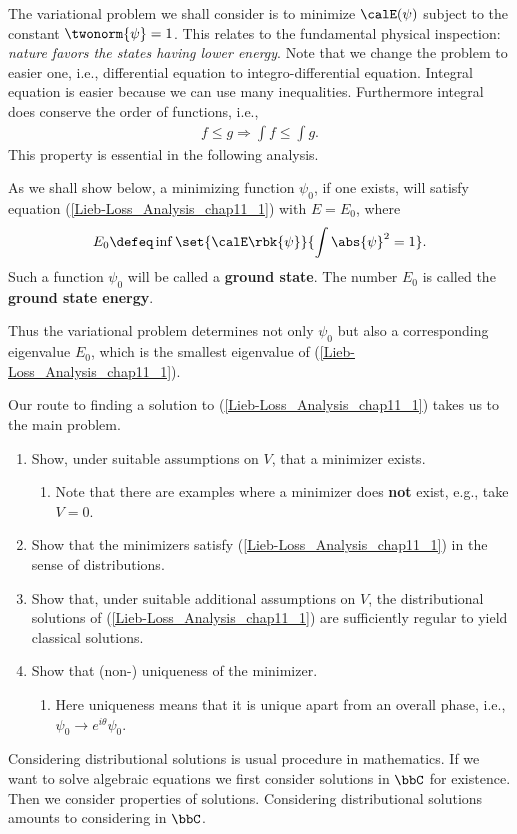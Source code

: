 \documentclass[openany, a4paper, oneside]{jsbook}
\begin{document}
The variational problem we shall consider is to minimize $\calE (\psi)$ subject to the constant $\twonorm{\psi} = 1$.
This relates to the fundamental physical inspection: \textit{nature favors the states having lower energy}.
Note that we change the problem to easier one, i.e., differential equation to integro-differential equation.
Integral equation is easier because we can use many inequalities.
Furthermore integral does conserve the order of functions, i.e.,
\begin{align}
 f \leq g
 \Longrightarrow
 \int f \leq \int g.
\end{align}
This property is essential in the following analysis.

As we shall show below, a minimizing function $\psi_0$, if one exists, will satisfy equation (\ref{Lieb-Loss_Analysis_chap11_1})
with $E = E_0$, where
\begin{align}
 E_0
 \defeq
 \inf \set{\calE \rbk{\psi}} {\int \abs{\psi}^2 = 1}.
\end{align}
Such a function $\psi_0$ will be called a \textbf{ground state}.
The number $E_0$ is called the \textbf{ground state energy}.

Thus the variational problem determines not only $\psi_0$ but also a corresponding eigenvalue $E_0$,
which is the smallest eigenvalue of (\ref{Lieb-Loss_Analysis_chap11_1}).

Our route to finding a solution to (\ref{Lieb-Loss_Analysis_chap11_1}) takes us to the main problem.
\begin{enumerate}
\item Show, under suitable assumptions on $V$, that a minimizer exists.
\begin{enumerate}
\item Note that there are examples where a minimizer does \textbf{not} exist, e.g., take $V = 0$.
\end{enumerate}
\item Show that the minimizers satisfy (\ref{Lieb-Loss_Analysis_chap11_1}) in the sense of distributions.
\item Show that, under suitable additional assumptions on $V$, the distributional
solutions of (\ref{Lieb-Loss_Analysis_chap11_1}) are sufficiently regular to yield classical solutions.
\item Show that (non-) uniqueness of the minimizer.
\begin{enumerate}
\item Here uniqueness means that it is unique apart from an overall phase, i.e., $\psi_0 \to e^{i \theta} \psi_0$.
\end{enumerate}
\end{enumerate}
Considering distributional solutions is usual procedure in mathematics.
If we want to solve algebraic equations we first consider solutions in $\bbC$ for existence.
Then we consider properties of solutions.
Considering distributional solutions amounts to considering in $\bbC$.
\end{document}
